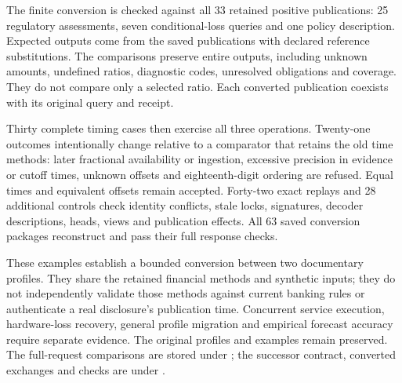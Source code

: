 The finite conversion is checked against all 33 retained positive publications:
25 regulatory assessments, seven conditional-loss queries and one policy
description. Expected outputs come from the saved publications with declared
reference substitutions. The comparisons preserve entire outputs, including
unknown amounts, undefined ratios, diagnostic codes, unresolved obligations
and coverage. They do not compare only a selected ratio. Each converted
publication coexists with its original query and receipt.

Thirty complete timing cases then exercise all three operations. Twenty-one
outcomes intentionally change relative to a comparator that retains the old
time methods: later fractional availability or ingestion, excessive precision
in evidence or cutoff times, unknown offsets and eighteenth-digit ordering
are refused. Equal times and equivalent offsets remain accepted. Forty-two
exact replays and 28 additional controls check identity conflicts, stale locks,
signatures, decoder descriptions, heads, views and publication effects. All 63
saved conversion packages reconstruct and pass their full response checks.

These examples establish a bounded conversion between two documentary
profiles. They share the retained financial methods and synthetic inputs; they
do not independently validate those methods against current banking rules or
authenticate a real disclosure's publication time. Concurrent service
execution, hardware-loss recovery, general profile migration and empirical
forecast accuracy require separate evidence. The original profiles and examples
remain preserved. The full-request comparisons are stored under
;
the successor contract, converted exchanges and checks are under
.
